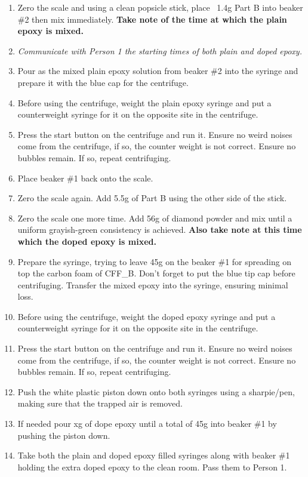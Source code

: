 \documentclass[12pt]{cornelltfpxsop}
\begin{document}
\begin{enumerate}
        \item Zero the scale and using a clean popsicle stick, place ~1.4g Part B into beaker \#2 then mix immediately. \textbf{Take note of the time at which the plain epoxy is mixed.}
        \item \textit{Communicate with Person 1 the starting times of both plain and doped epoxy.}   
        \item Pour as the mixed plain epoxy solution from beaker \#2 into the syringe and prepare it with the blue cap for the centrifuge.
        \item Before using the centrifuge, weight the plain epoxy syringe and put a counterweight syringe for it on the opposite site in the centrifuge.
        \item Press the start button on the centrifuge and run it. Ensure no weird noises come from the centrifuge, if so, the counter weight is not correct. Ensure no bubbles remain. If so, repeat centrifuging.
        \item Place beaker \#1 back onto the scale. 
        \item Zero the scale again. Add 5.5g of Part B using the other side of the stick.   
        \item Zero the scale one more time. Add 56g of diamond powder and mix until a uniform grayish-green consistency is achieved.  \textbf{Also take note at this time which the doped epoxy is mixed.}
        \item Prepare the syringe, trying to leave 45g on the beaker \#1 for spreading on top the carbon foam of CFF\_B. Don't forget to put the blue tip cap before centrifuging. Transfer the mixed epoxy into the syringe, ensuring minimal loss.
        \item Before using the centrifuge, weight the doped epoxy syringe and put a counterweight syringe for it on the opposite site in the centrifuge.
        \item Press the start button on the centrifuge and run it. Ensure no weird noises come from the centrifuge, if so, the counter weight is not correct. Ensure no bubbles remain. If so, repeat centrifuging.
        \item Push the white plastic piston down onto both syringes using a sharpie/pen, making sure that the trapped air is removed. 
        \item If needed pour xg of dope epoxy until a total of 45g into beaker \#1 by pushing the piston down.
        \item Take both the plain and doped epoxy filled syringes along with beaker \#1 holding the extra doped epoxy to the clean room. Pass them to Person 1.

\end{enumerate}
\end{document}
